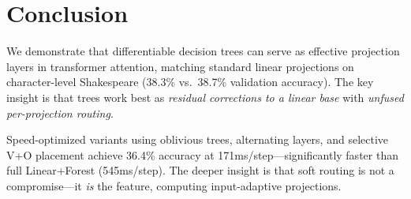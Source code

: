 \documentclass[11pt,a4paper]{article}
\begin{document}
\section{Conclusion}

We demonstrate that differentiable decision trees can serve as effective projection layers in transformer attention, matching standard linear projections on character-level Shakespeare (38.3\% vs.\ 38.7\% validation accuracy). The key insight is that trees work best as \textit{residual corrections to a linear base} with \textit{unfused per-projection routing}.

Speed-optimized variants using oblivious trees, alternating layers, and selective V+O placement achieve 36.4\% accuracy at 171ms/step---significantly faster than full Linear+Forest (545ms/step). The deeper insight is that soft routing is not a compromise---it \textit{is} the feature, computing input-adaptive projections.
\end{document}
